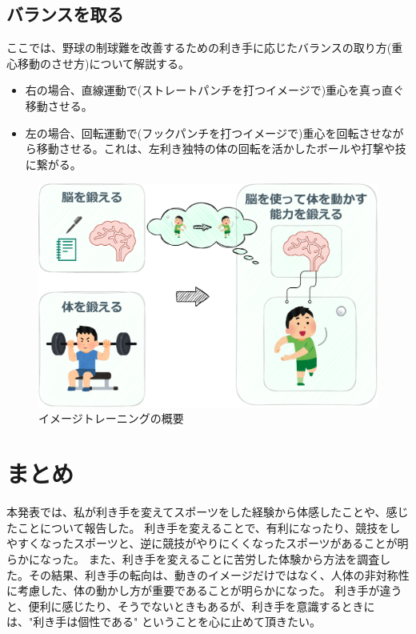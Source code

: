 \documentclass[a4paper,10pt,twocolumn]{jsarticle}
\begin{document}
\subsection{バランスを取る}
ここでは、野球の制球難を改善するための利き手に応じたバランスの取り方(重心移動のさせ方)について解説する。\cite{balance}
\begin{itemize}
    \item 右の場合、直線運動で(ストレートパンチを打つイメージで)重心を真っ直ぐ移動させる。
    \item 左の場合、回転運動で(フックパンチを打つイメージで)重心を回転させながら移動させる。これは、左利き独特の体の回転を活かしたボールや打撃や技に繋がる。
\end{itemize}

\begin{figure}[H]
    \centering
    \includegraphics[scale=0.36]{img/training.pdf}
    \caption{イメージトレーニングの概要}
    \label{training}
\end{figure}

\section{まとめ}
本発表では、私が利き手を変えてスポーツをした経験から体感したことや、感じたことについて報告した。
利き手を変えることで、有利になったり、競技をしやすくなったスポーツと、逆に競技がやりにくくなったスポーツがあることが明らかになった。
また、利き手を変えることに苦労した体験から方法を調査した。その結果、利き手の転向は、動きのイメージだけではなく、人体の非対称性に考慮した、体の動かし方が重要であることが明らかになった。
利き手が違うと、便利に感じたり、そうでないときもあるが、利き手を意識するときには、"利き手は個性である" ということを心に止めて頂きたい。
\end{document}
